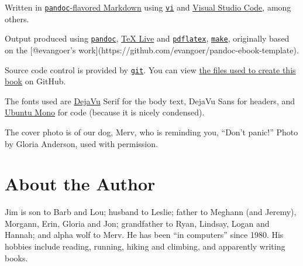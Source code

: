 \documentclass[10pt,]{book}
\numberwithin{figure}{chapter}
\begin{document}
Written in
\href{http://pandoc.org/README.html\#pandocs-markdown}{\texttt{pandoc}-flavored
Markdown} using \href{http://linux.die.net/man/1/vi}{\texttt{vi}} and
\href{https://github.com/Microsoft/vscode}{Visual Studio Code}, among
others.

Output produced using \href{http://pandoc.org/}{\texttt{pandoc}},
\href{http://www.tug.org/texlive/}{TeX Live} and
\href{http://linux.die.net/man/1/pdflatex}{\texttt{pdflatex}},
\href{http://linux.die.net/man/1/make}{\texttt{make}}, originally based
on the {[}@evangoer's
work{]}(https://github.com/evangoer/pandoc-ebook-template).

Source code control is provided by
\href{http://linux.die.net/man/1/git}{\texttt{git}}. You can view
\href{https://github.com/dullroar/ten-steps-to-linux-survival}{the files
used to create this book} on GitHub.

The fonts used are
\href{https://en.wikipedia.org/wiki/DejaVu_fonts}{DejaVu} Serif for the
body text, DejaVu Sans for headers, and
\href{https://en.wikipedia.org/wiki/Ubuntu_\%28typeface\%29}{Ubuntu
Mono} for code (because it is nicely condensed).

The cover photo is of our dog, Merv, who is reminding you, ``Don't
panic!'' Photo by Gloria Anderson, used with permission.

\section{About the Author}\label{about-the-author}

Jim is son to Barb and Lou; husband to Leslie; father to Meghann (and
Jeremy), Morgann, Erin, Gloria and Jon; grandfather to Ryan, Lindsay,
Logan and Hannah; and alpha wolf to Merv. He has been ``in computers''
since 1980. His hobbies include reading, running, hiking and climbing,
and apparently writing books.



\cleardoublepage
{}
\printindex
\end{document}
